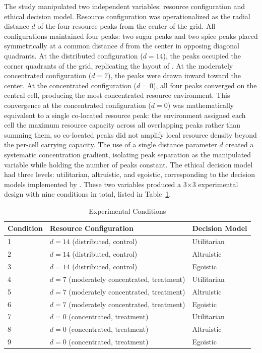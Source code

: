 \documentclass{icsthesis}
\begin{document}
\begin{mainmatter}
				The study manipulated two independent variables: resource configuration and ethical decision model. Resource configuration was operationalized as the radial distance $d$ of the four resource peaks from the center of the grid. All configurations maintained four peaks: two sugar peaks and two spice peaks placed symmetrically at a common distance $d$ from the center in opposing diagonal quadrants. At the distributed configuration ($d = 14$), the peaks occupied the corner quadrants of the grid, replicating the layout of \citet{KremerHerman2024}. At the moderately concentrated configuration ($d = 7$), the peaks were drawn inward toward the center. At the concentrated configuration ($d = 0$), all four peaks converged on the central cell, producing the most concentrated resource environment. This convergence at the concentrated configuration ($d = 0$) was mathematically equivalent to a single co-located resource peak: the environment assigned each cell the maximum resource capacity across all overlapping peaks rather than summing them, so co-located peaks did not amplify local resource density beyond the per-cell carrying capacity. The use of a single distance parameter $d$ created a systematic concentration gradient, isolating peak separation as the manipulated variable while holding the number of peaks constant. The ethical decision model had three levels: utilitarian, altruistic, and egoistic, corresponding to the decision models implemented by \citet{KremerHerman2024}. These two variables produced a 3$\times$3 experimental design with nine conditions in total, listed in Table~\ref{table:experimental-conditions}.

				\begin{table}[H]
				\vspace{4ex}
				\centering
					\caption{Experimental Conditions}
					\label{table:experimental-conditions}
					\begin{tabular}{lll}
					\hline\hline
					\textbf{Condition} & \textbf{Resource Configuration} & \textbf{Decision Model} \\ \hline
					1 & $d = 14$ (distributed, control)  & Utilitarian \\
					2 & $d = 14$ (distributed, control)  & Altruistic \\
					3 & $d = 14$ (distributed, control)  & Egoistic \\
					4 & $d = 7$  (moderately concentrated, treatment) & Utilitarian \\
					5 & $d = 7$  (moderately concentrated, treatment) & Altruistic \\
					6 & $d = 7$  (moderately concentrated, treatment) & Egoistic \\
					7 & $d = 0$  (concentrated, treatment) & Utilitarian \\
					8 & $d = 0$  (concentrated, treatment) & Altruistic \\
					9 & $d = 0$  (concentrated, treatment) & Egoistic \\ \hline\hline
					\end{tabular}
				\vspace{4ex}
				\end{table}


\end{mainmatter}
\end{document}
